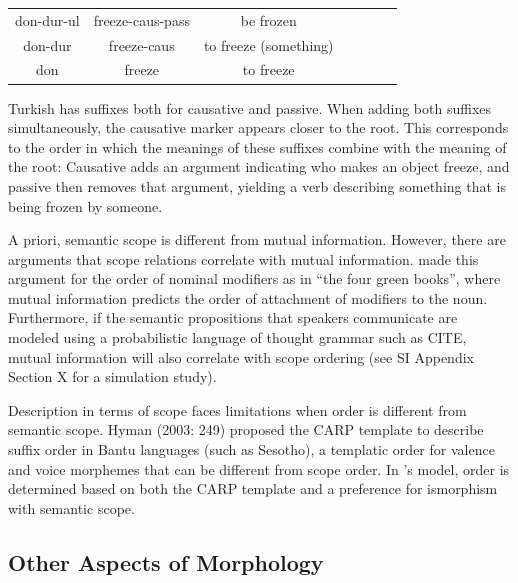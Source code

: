 \documentclass[11pt,letterpaper]{article}
\begin{document}
\begin{tabular}{ccccccc}
don-dur-ul & freeze-caus-pass & be frozen \\
don-dur & freeze-caus & to freeze (something) \\
don & freeze& to freeze \\
\end{tabular}

Turkish has suffixes both for causative and passive.
When adding both suffixes simultaneously, the causative marker appears closer to the root.
This corresponds to the order in which the meanings of these suffixes combine with the meaning of the root:
Causative adds an argument indicating who makes an object freeze, and passive then removes that argument, yielding a verb describing something that is being frozen by someone.

A priori, semantic scope is different from mutual information.
However, there are arguments that scope relations correlate with mutual information.
\citet{culbertson2020from} made this argument for the order of nominal modifiers as in ``the four green books'', where mutual information predicts the order of attachment of modifiers to the noun.
Furthermore, if the semantic propositions that speakers communicate are modeled using a probabilistic language of thought grammar such as CITE, mutual information will also correlate with scope ordering (see SI Appendix Section X for a simulation study).

Description in terms of scope faces limitations when order is different from semantic scope.
\cite{Hyman2003}
Hyman  (2003:  249) proposed the CARP template to describe suffix order in Bantu languages (such as Sesotho), a templatic order for valence and voice morphemes that can be different from scope order.
In \cite{Hyman2003}'s model, order is determined based on both the CARP template and a preference for ismorphism with semantic scope.








\subsection{Other Aspects of Morphology}
\end{document}
